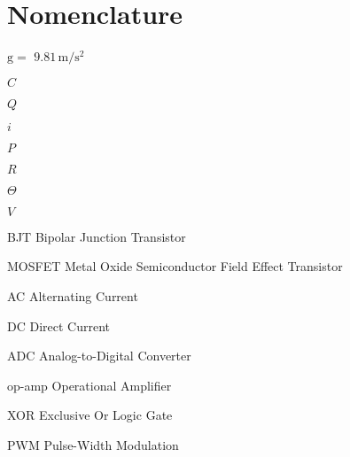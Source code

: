 \chapter{Nomenclature}

\begin{Nomencl}
   \item[$\mathrm{g} = $] $\mathrm{9.81\,m/s^2}$

   \item[$C$] 
   \item[$Q$] 
   \item[$i$] 
   \item[$P$] 
   \item[$R$] 
   \item[$\Theta$] 
   \item[$V$] 

   \item[BJT] \quad\dotfill Bipolar Junction Transistor
   \item[MOSFET] \quad\dotfill Metal Oxide Semiconductor Field Effect Transistor
   \item[AC]  \quad\dotfill Alternating Current
   \item[DC]  \quad\dotfill Direct Current
   \item[ADC]  \quad\dotfill Analog-to-Digital Converter
   \item[op-amp]  \quad\dotfill Operational Amplifier
   \item[XOR]  \quad\dotfill Exclusive Or Logic Gate
   \item[PWM]  \quad\dotfill Pulse-Width Modulation

\end{Nomencl}


\endinput
